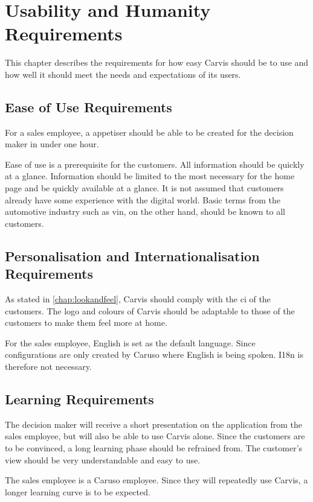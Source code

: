 \chapter{Usability and Humanity Requirements}
This chapter describes the requirements for how easy Carvis should be to use and how well it should meet the needs and expectations of its users.

\section{Ease of Use Requirements}
For a sales employee, a \gls{appetiser} should be able to be created for the decision maker in under one hour. 

Ease of use is a prerequisite for the customers. All information should be quickly at a glance. 
Information should be limited to the most necessary for the home page and be quickly available at a glance.
It is not assumed that customers already have some experience with the digital world. 
Basic terms from the automotive industry such as \gls{vin}, on the other hand, should be known to all customers.

\section{Personalisation and Internationalisation Requirements}
As stated in \autoref{chap:lookandfeel}, Carvis should comply with the \gls{ci} of the customers. The logo and colours of Carvis should be adaptable to those of the customers to make them feel more at home.

For the sales employee, English is set as the default language. Since configurations are only created by Caruso where English is being spoken. I18n is therefore not necessary.

\section{Learning Requirements}
The decision maker will receive a short presentation on the application from the sales employee, but will also be able to use Carvis alone. 
Since the customers are to be convinced, a long learning phase should be refrained from.
The customer's view should be very understandable and easy to use. 

The sales employee is a Caruso employee. Since they will repeatedly use Carvis, a longer learning curve is to be expected. 